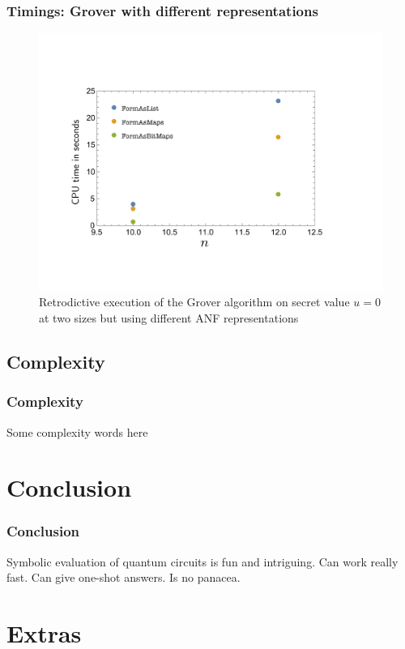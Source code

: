 \documentclass{beamer}
\begin{document}
\begin{frame}
  \frametitle{Timings: Grover with different representations}
\begin{figure}
\includegraphics[scale=0.30]{../../pepm/Figure14.pdf}
\caption{Retrodictive
  execution of the Grover algorithm on secret value $u=0$ at two
  sizes but using different ANF representations}
\end{figure}
\end{frame}

\subsection[Complexity]{Complexity}

\begin{frame}
  \frametitle{Complexity}
  Some complexity words here
\end{frame}

\section[Conclusion]{Conclusion}

\begin{frame}
  \frametitle{Conclusion}
  Symbolic evaluation of quantum circuits is fun and intriguing.
  Can work really fast. Can give one-shot answers. Is no panacea.
\end{frame}


\section[Extras]{Extras}
\end{document}
